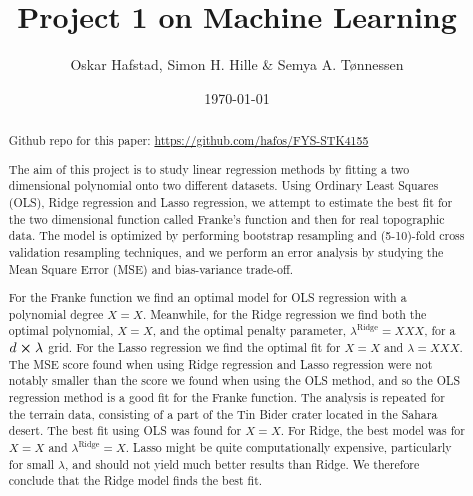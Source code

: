 \documentclass[reprint,english,notitlepage]{revtex4-1}  %
\begin{document}
\title{Project 1 on Machine Learning}   %
\author{Oskar Hafstad, Simon H. Hille \& Semya A. Tønnessen}               %
\date{\today}                             %
\noaffiliation                            %
\begin{abstract}                          %
Github repo for this paper: \url{https://github.com/hafos/FYS-STK4155}
\vspace{3mm}

The aim of this project is to study linear regression methods by fitting a two dimensional polynomial onto two different datasets. 
Using Ordinary Least Squares (OLS), Ridge regression and Lasso regression, we attempt to estimate the best fit for the two dimensional function called Franke's function and then for real topographic data. 
The model is optimized by performing bootstrap resampling and (5-10)-fold cross validation resampling techniques, and we perform an error analysis by studying the Mean Square Error (MSE) and bias-variance trade-off. 

For the Franke function
we find an optimal model for OLS regression with a polynomial degree $X = X$. Meanwhile, for the Ridge regression we find both the optimal polynomial, $X = X$, and the optimal penalty parameter, $\lambda^\text{Ridge} = XXX$, for a $d\cross\lambda$ grid. For the Lasso regression we find the optimal fit for $X = X$ and $\lambda = XXX$. 
The MSE score found when using Ridge regression and Lasso regression were not notably smaller than the score we found when using the OLS method, and so the OLS regression method is a good fit for the Franke function. 
The analysis is repeated for the terrain data, consisting of a part of the Tin Bider crater located in the Sahara desert. 
The best fit using OLS was found for $ X = X$. For Ridge, the best model was for $ X = X$ and $\lambda^\text{Ridge} = X$. 
Lasso might be quite computationally expensive, particularly for small $\lambda$, and should not yield much better results than Ridge. We therefore conclude that the Ridge model finds the best fit. 
\end{abstract}                            %
\maketitle                                %
\end{document}
